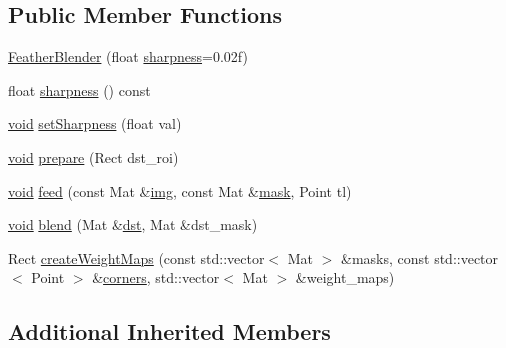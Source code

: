 \subsection*{Public Member Functions}
\begin{DoxyCompactItemize}
\item 
\hyperlink{classcv_1_1detail_1_1FeatherBlender_a8af0665c8cb305e32a208a873addece9}{Feather\-Blender} (float \hyperlink{classcv_1_1detail_1_1FeatherBlender_ac2c53caa58c13db6cacb637e0495cac6}{sharpness}=0.\-02f)
\item 
float \hyperlink{classcv_1_1detail_1_1FeatherBlender_ac2c53caa58c13db6cacb637e0495cac6}{sharpness} () const 
\item 
\hyperlink{legacy_8hpp_a8bb47f092d473522721002c86c13b94e}{void} \hyperlink{classcv_1_1detail_1_1FeatherBlender_aa4c09de778a01cdad7af1aabc443b279}{set\-Sharpness} (float val)
\item 
\hyperlink{legacy_8hpp_a8bb47f092d473522721002c86c13b94e}{void} \hyperlink{classcv_1_1detail_1_1FeatherBlender_a8e495775d443ff6cb600fb927ebe6516}{prepare} (Rect dst\-\_\-roi)
\item 
\hyperlink{legacy_8hpp_a8bb47f092d473522721002c86c13b94e}{void} \hyperlink{classcv_1_1detail_1_1FeatherBlender_ad42e4d99cc5ce7d3b9796f8cf1e038df}{feed} (const Mat \&\hyperlink{legacy_8hpp_a5349238b3772bed6eae0fda3117ccfef}{img}, const Mat \&\hyperlink{tracking_8hpp_a6b13ecd2fd6ec7ad422f1d7863c3ad19}{mask}, Point tl)
\item 
\hyperlink{legacy_8hpp_a8bb47f092d473522721002c86c13b94e}{void} \hyperlink{classcv_1_1detail_1_1FeatherBlender_a02d486e87cc508c9368de08227c9133b}{blend} (Mat \&\hyperlink{photo__c_8h_aed13e2a25279b24dc954073233fef7a5}{dst}, Mat \&dst\-\_\-mask)
\item 
Rect \hyperlink{classcv_1_1detail_1_1FeatherBlender_a7f19aee54c676a96fdf5d428ce049e1b}{create\-Weight\-Maps} (const std\-::vector$<$ Mat $>$ \&masks, const std\-::vector$<$ Point $>$ \&\hyperlink{imgproc__c_8h_a223e965e192c7025d6c6be77305f515b}{corners}, std\-::vector$<$ Mat $>$ \&weight\-\_\-maps)
\end{DoxyCompactItemize}
\subsection*{Additional Inherited Members}


